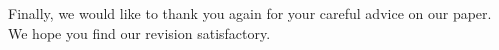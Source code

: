 \documentclass[12pt,letterpaper,english]{article}
\begin{document}
\bigskip

\noindent Finally, we would like to thank you again for your careful advice on our paper. We hope you find our revision satisfactory.



\end{document}

